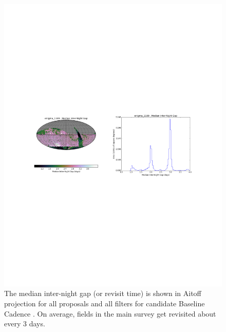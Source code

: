 \begin{figure}[t!]
\vskip -4.1in
\hskip -0.5in
\includegraphics[angle=0,width=1.19\hsize:,clip]{figs/enigma1189_interGapAll.pdf}
\vskip -4.0in
\caption{The median inter-night gap (or revisit time) is shown in Aitoff projection
for all proposals and all filters for candidate Baseline Cadence .
On average, fields in the main survey get revisited about every 3 days.}
\label{fig:enigmaGapAll}
\end{figure}

